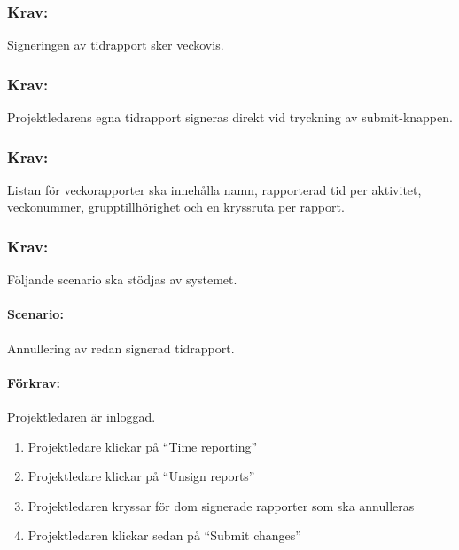 \documentclass[paper=a4, fontsize=11pt,twoside]{article}
\begin{document}
\paragraph{}

\subsubsection{Krav:}
Signeringen av tidrapport sker veckovis.

\paragraph{}

\subsubsection{Krav:}
Projektledarens egna tidrapport signeras direkt vid tryckning av submit-knappen.

\paragraph{}

\subsubsection{Krav:}
Listan för veckorapporter ska innehålla namn, rapporterad tid per aktivitet, veckonummer, grupptillhörighet och en kryssruta per rapport.

\paragraph{}

\subsubsection{Krav:}
Följande scenario ska stödjas av systemet.
\paragraph{Scenario:} Annullering av redan signerad tidrapport.
\paragraph{Förkrav:} Projektledaren är inloggad.
\begin{enumerate}
\item Projektledare klickar på “Time reporting”
\item Projektledare klickar på “Unsign reports”
\item Projektledaren kryssar för dom signerade rapporter som ska annulleras
\item Projektledaren klickar sedan på “Submit changes”
\end{enumerate}
\end{document}
